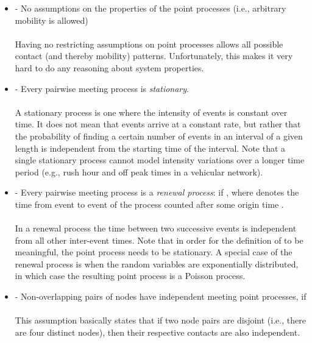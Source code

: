 \documentclass{article}
\begin{document}
\begin{itemize}
\item  - No assumptions on the properties of the point processes (i.e., arbitrary mobility is allowed)\\
\\
Having no restricting assumptions on point processes allows all
possible contact (and thereby mobility) patterns. Unfortunately, this
makes it very hard to do any reasoning about system properties.

\item  - Every pairwise meeting process  is
  \emph{stationary}.\\
  \\
  A stationary process is one where the intensity of events is
  constant over time. It does not mean that events arrive at a
  constant rate, but rather that the probability of finding a certain
  number of events in an interval of a given length is independent
  from the starting time of the interval. Note that a single stationary
  process cannot model intensity variations over a longer time period
  (e.g., rush hour and off peak times in a vehicular network). 

\item  - Every pairwise meeting process is a
  \emph{renewal process}:  if , where  denotes the time from event  to event
   of the process  counted after some origin time .\\
\\
In a renewal process the time between two successive events is
independent from all other inter-event times. Note that in order for
the definition of  to be meaningful, the point
process needs to be stationary. A special case of the renewal process
is when the random variables  are exponentially
distributed, in which case the resulting point process is a Poisson
process.

\item  - Non-overlapping pairs of nodes have independent meeting point processes,  if \\
  \\
  This assumption basically states that if two node pairs are disjoint
  (i.e., there are four distinct nodes), then their respective
  contacts are also independent.


\end{itemize}
\end{document}
